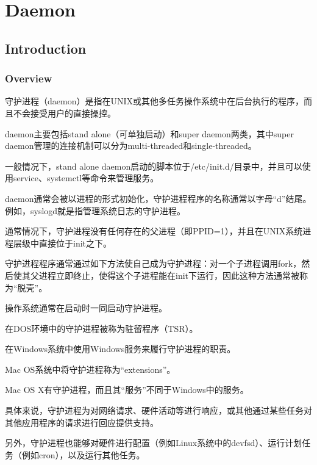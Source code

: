 \part{Daemon}


\chapter{Introduction}


\section{Overview}





守护进程（daemon）是指在UNIX或其他多任务操作系统中在后台执行的程序，而且不会接受用户的直接操控。

daemon主要包括stand alone（可单独启动）和super daemon两类，其中super daemon管理的连接机制可以分为multi-threaded和single-threaded。

一般情况下，stand alone daemon启动的脚本位于/etc/init.d/目录中，并且可以使用service、systemctl等命令来管理服务。

daemon通常会被以进程的形式初始化，守护进程程序的名称通常以字母“d”结尾。例如，syslogd就是指管理系统日志的守护进程。



通常情况下，守护进程没有任何存在的父进程（即PPID=1），并且在UNIX系统进程层级中直接位于init之下。

守护进程程序通常通过如下方法使自己成为守护进程：对一个子进程调用fork，然后使其父进程立即终止，使得这个子进程能在init下运行，因此这种方法通常被称为“脱壳”。

操作系统通常在启动时一同启动守护进程。

\begin{compactitem}
\item 在DOS环境中的守护进程被称为驻留程序（TSR）。
\item 在Windows系统中使用Windows服务来履行守护进程的职责。
\item Mac OS系统中将守护进程称为“extensions”。
\item Mac OS X有守护进程，而且其“服务”不同于Windows中的服务。
\end{compactitem}



具体来说，守护进程为对网络请求、硬件活动等进行响应，或其他通过某些任务对其他应用程序的请求进行回应提供支持。




另外，守护进程也能够对硬件进行配置（例如Linux系统中的devfsd）、运行计划任务（例如cron），以及运行其他任务。




